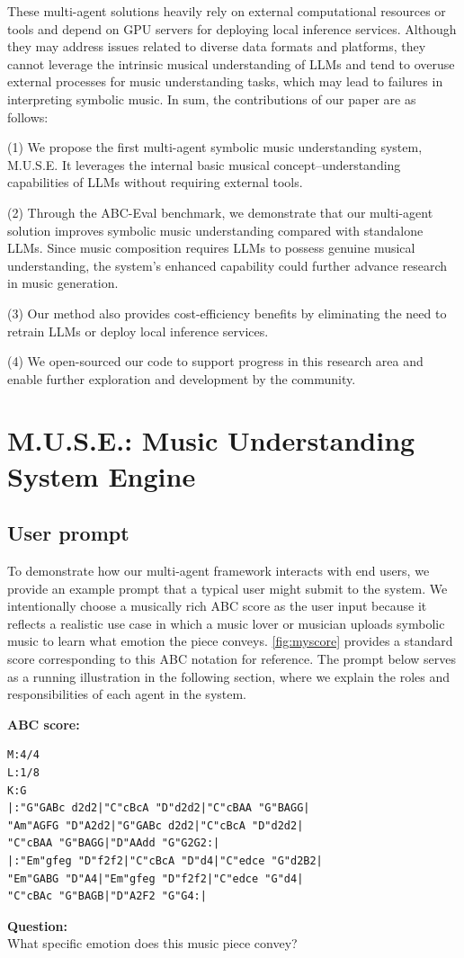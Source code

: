 \documentclass[sigconf]{acmart}
\begin{document}
These multi-agent solutions heavily rely on external computational resources or tools and depend on GPU servers for deploying local inference services. Although they may address issues related to diverse data formats and platforms, they cannot leverage the intrinsic musical understanding of LLMs and tend to overuse external processes for music understanding tasks, which may lead to failures in interpreting symbolic music. In sum, the contributions of our paper are as follows:

(1) We propose the first multi-agent symbolic music understanding system, M.U.S.E. It leverages the internal basic musical concept–understanding capabilities of LLMs without requiring external tools.

(2) Through the ABC-Eval benchmark\citep{zhaoABCEvalBenchmarkingLarge2025}, we demonstrate that our multi-agent solution improves symbolic music understanding compared with standalone LLMs. Since music composition requires LLMs to possess genuine musical understanding, the system’s enhanced capability could further advance research in music generation.

(3) Our method also provides cost-efficiency benefits by eliminating the need to retrain LLMs or deploy local inference services.

(4) We open-sourced our code to support progress in this research area and enable further exploration and development by the community.


\section{M.U.S.E.: Music Understanding System Engine}

\subsection{User prompt}
To demonstrate how our multi-agent framework interacts with end users, we provide an example prompt that a typical user might submit to the system. We intentionally choose a musically rich ABC score as the user input because it reflects a realistic use case in which a music lover or musician uploads symbolic music to learn what emotion the piece conveys. \autoref{fig:myscore} provides a standard score corresponding to this ABC notation for reference. The prompt below serves as a running illustration in the following section, where we explain the roles and responsibilities of each agent in the system.

\begin{tcolorbox}[title=Example of user prompt, colback=gray!10, colframe=gray!60, listing only]
\textbf{ABC score:}
\begin{verbatim}
M:4/4
L:1/8
K:G
|:"G"GABc d2d2|"C"cBcA "D"d2d2|"C"cBAA "G"BAGG|
"Am"AGFG "D"A2d2|"G"GABc d2d2|"C"cBcA "D"d2d2|
"C"cBAA "G"BAGG|"D"AAdd "G"G2G2:|
|:"Em"gfeg "D"f2f2|"C"cBcA "D"d4|"C"edce "G"d2B2|
"Em"GABG "D"A4|"Em"gfeg "D"f2f2|"C"edce "G"d4|
"C"cBAc "G"BAGB|"D"A2F2 "G"G4:|
\end{verbatim}
\textbf{Question:} \\
What specific emotion does this music piece convey?
\end{tcolorbox}
\end{document}
